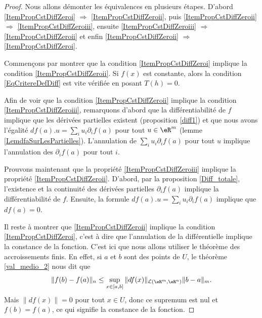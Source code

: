 \begin{proof}
	Nous allons démonter les équivalences en plusieurs étapes. D'abord \ref{ItemPropCstDiffZeroi} $\Rightarrow$ \ref{ItemPropCstDiffZeroii}, puis \ref{ItemPropCstDiffZeroii} $\Rightarrow$ \ref{ItemPropCstDiffZeroiii}, ensuite \ref{ItemPropCstDiffZeroiii} $\Rightarrow$ \ref{ItemPropCstDiffZeroii} et enfin \ref{ItemPropCstDiffZeroii} $\Rightarrow$ \ref{ItemPropCstDiffZeroi}.

	Commençons par montrer que la condition \ref{ItemPropCstDiffZeroi} implique la condition \ref{ItemPropCstDiffZeroii}. Si $f(x)$ est constante, alors la condition \eqref{EqCritereDefDiff} est vite vérifiée en posant $T(h)=0$.

	Afin de voir que la condition \ref{ItemPropCstDiffZeroii} implique la condition \ref{ItemPropCstDiffZeroiii}, remarquons d'abord que la différentiabilité de $f$ implique que les dérivées partielles existent (proposition \ref{diff1}) et que nous avons l'égalité $df(a).u=\sum_iu_i\partial_if(a)$ pour tout $u\in\eR^m$ (lemme \ref{LemdfaSurLesPartielles}). L'annulation de $\sum_iu_i\partial_if(a)$ pour tout $u$ implique l'annulation des $\partial_if(a)$ pour tout $i$.

	Prouvons maintenant que la propriété \ref{ItemPropCstDiffZeroiii} implique la propriété \ref{ItemPropCstDiffZeroii}. D'abord, par la proposition \ref{Diff_totale}, l'existence et la continuité des dérivées partielles $\partial_if(a)$ implique la différentiabilité de $f$. Ensuite, la formule $df(a).u=\sum_i u_i\partial_if(a)$ implique que $df(a)=0$. 
	
	
	Il reste à montrer que \ref{ItemPropCstDiffZeroii} implique la condition \ref{ItemPropCstDiffZeroi}, c'est à dire que l'annulation de la différentielle implique la constance de la fonction. C'est ici que nous allons utiliser le théorème des accroissements finis. En effet, si $a$ et $b$ sont des points de $U$, le théorème \ref{val_medio_2} nous dit que
	\begin{equation}
		\|f(b)-f(a)\|_n\leq \sup_{x\in[a,b]}\|df(x)\|_{\mathcal{L}(\eR^m,\eR^n)}\|b-a\|_m.
	\end{equation}
	Mais $\| df(x) \|=0$ pour tout $x\in U$, donc ce supremum est nul et $f(b)=f(a)$, ce qui signifie la constance de la fonction.
\end{proof}


